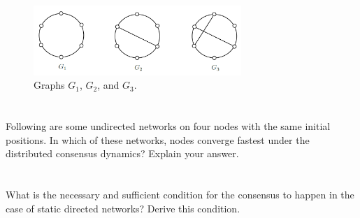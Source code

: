 \documentclass[]{article}
\numberwithin{equation}{section}
\begin{document}
\begin{figure}[h]
	\centering
	\includegraphics[width=0.7\textwidth]{figs/pblm6.png}
	\caption{Graphs $G_1$, $G_2$, and $G_3$.}
	\label{fig:pblm6}
\end{figure}










\newpage
\section{}
Following are some undirected networks on four nodes with the same initial positions.
In which of these networks, nodes converge fastest under the distributed consensus dynamics? 
Explain your answer.













\newpage
\section{}
What is the necessary and sufficient condition for the consensus to happen in the case of static directed networks? 
Derive this condition.


















\newpage
\appendix




\cite{*}
\end{document}
